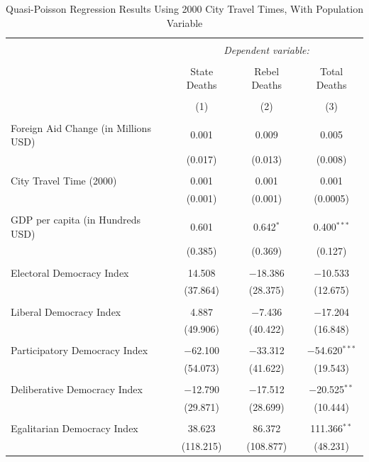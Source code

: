\documentclass[12pt, letterpaper]{article}
\begin{document}
\begin{table}[!htbp] \centering 
	\caption{Quasi-Poisson Regression Results Using 2000 City Travel Times, With Population Variable} 
	\begin{tabular}{@{\extracolsep{5pt}}lccc} 
		\\[-1.8ex]\hline 
		\hline \\[-1.8ex] 
		& \multicolumn{3}{c}{\textit{Dependent variable:}} \\ 
		\cline{2-4} 
		\\[-1.8ex] & State Deaths & Rebel Deaths & Total Deaths \\ 
		\\[-1.8ex] & (1) & (2) & (3)\\ 
		\hline \\[-1.8ex] 
		Foreign Aid Change (in Millions USD) & 0.001 & 0.009 & 0.005 \\ 
		& (0.017) & (0.013) & (0.008) \\ 
		& & & \\ 
		City Travel Time (2000) & 0.001 & 0.001 & 0.001 \\ 
		& (0.001) & (0.001) & (0.0005) \\ 
		& & & \\ 
		GDP per capita (in Hundreds USD) & 0.601 & 0.642$^{*}$ & 0.400$^{***}$ \\ 
		& (0.385) & (0.369) & (0.127) \\ 
		& & & \\ 
		Electoral Democracy Index & 14.508 & $-$18.386 & $-$10.533 \\ 
		& (37.864) & (28.375) & (12.675) \\ 
		& & & \\ 
		Liberal Democracy Index & 4.887 & $-$7.436 & $-$17.204 \\ 
		& (49.906) & (40.422) & (16.848) \\ 
		& & & \\ 
		Participatory Democracy Index & $-$62.100 & $-$33.312 & $-$54.620$^{***}$ \\ 
		& (54.073) & (41.622) & (19.543) \\ 
		& & & \\ 
		Deliberative Democracy Index & $-$12.790 & $-$17.512 & $-$20.525$^{**}$ \\ 
		& (29.871) & (28.699) & (10.444) \\ 
		& & & \\ 
		Egalitarian Democracy Index & 38.623 & 86.372 & 111.366$^{**}$ \\ 
		& (118.215) & (108.877) & (48.231) \\ 

\end{tabular}
\end{table}
\end{document}
